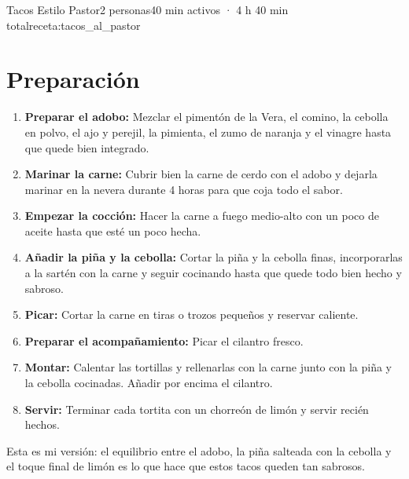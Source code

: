 \begin{recetaConImagen}{Tacos Estilo Pastor}{2 personas}{40 min activos · 4 h 40 min total}{receta:tacos_al_pastor}
\begin{minipage}[t]{0.6\textwidth}
        \section*{Preparación}
        \begin{enumerate}
            \item \textbf{Preparar el adobo:} Mezclar el pimentón de la Vera, el comino, la cebolla en polvo, el ajo y perejil, la pimienta, el zumo de naranja y el vinagre hasta que quede bien integrado.
            \item \textbf{Marinar la carne:} Cubrir bien la carne de cerdo con el adobo y dejarla marinar en la nevera durante 4 horas para que coja todo el sabor.
            \item \textbf{Empezar la cocción:} Hacer la carne a fuego medio-alto con un poco de aceite hasta que esté un poco hecha.
            \item \textbf{Añadir la piña y la cebolla:} Cortar la piña y la cebolla finas, incorporarlas a la sartén con la carne y seguir cocinando hasta que quede todo bien hecho y sabroso.
            \item \textbf{Picar:} Cortar la carne en tiras o trozos pequeños y reservar caliente.
            \item \textbf{Preparar el acompañamiento:} Picar el cilantro fresco.
            \item \textbf{Montar:} Calentar las tortillas y rellenarlas con la carne junto con la piña y la cebolla cocinadas. Añadir por encima el cilantro.
            \item \textbf{Servir:} Terminar cada tortita con un chorreón de limón y servir recién hechos.
        \end{enumerate}
    \end{minipage}

    \vspace{1em}
    \begin{tcolorbox}[colback=orange!5, colframe=orange!50, title=Nota, size=small]
        Esta es mi versión: el equilibrio entre el adobo, la piña salteada con la cebolla y el toque final de limón es lo que hace que estos tacos queden tan sabrosos.
    \end{tcolorbox}
\end{recetaConImagen}
